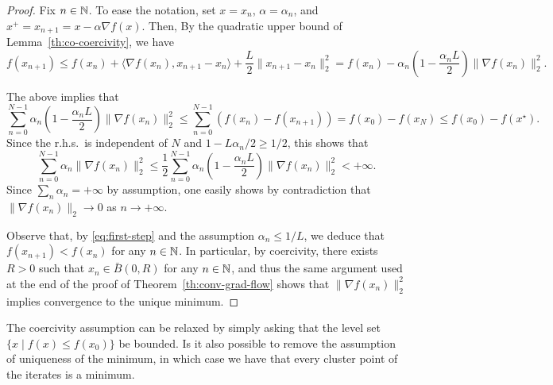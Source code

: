 \documentclass{report}
\begin{document}
\begin{proof}
	Fix $n\in\mathbb{N}$.
	To ease the notation, set $x=x_n$, $\alpha = \alpha_n$, and $x^+=x_{n+1}=x-\alpha \nabla f(x)$. Then, 
	By the quadratic upper bound of Lemma~\ref{th:co-coercivity}, we have
	\begin{equation}
		\label{eq:first-step}
			f(x_{n+1}) 
			\le f(x_n) + \langle \nabla f(x_n), x_{n+1}-x_n \rangle+\frac{L}2\|x_{n+1}-x_n\|_2^2
			= f(x_n)-\alpha_n \left(1-\frac{\alpha_n L}2\right) \|\nabla f(x_n)\|_2^2.
	\end{equation}

	The above implies that 
	\begin{equation}
		\sum_{n=0}^{N-1} \alpha_n \left(1-\frac{\alpha_n L}2\right) \|\nabla f(x_n)\|_2^2 \le \sum_{n=0}^{N-1} \left(f(x_{n})-f(x_{n+1})\right) =f(x_0) - f(x_N) \le f(x_0)-f(x^\star).
	\end{equation}
	Since the r.h.s.~is independent of $N$ and $1-L\alpha_n/2 \ge 1/2$, this shows that 
	\begin{equation}
		\sum_{n=0}^{N-1} \alpha_n  \|\nabla f(x_n)\|_2^2 \le
		\frac12\sum_{n=0}^{N-1} \alpha_n \left(1-\frac{\alpha_n L}2\right) \|\nabla f(x_n)\|_2^2 < +\infty.
	\end{equation}
	Since $\sum_n \alpha_n = +\infty$ by assumption, one easily shows by contradiction that $\|\nabla f(x_n)\|_2\rightarrow 0$ as $n\to +\infty$. 

	Observe that, by \eqref{eq:first-step} and the assumption $\alpha_n\le 1/L$, we deduce that $f(x_{n+1})<f(x_n)$ for any $n\in \mathbb{N}$. In particular, by coercivity, there exists $R>0$ such that $x_n\in \bar B(0,R)$ for any $n\in \mathbb{N}$, and thus the same argument used at the end of the proof of Theorem~\ref{th:conv-grad-flow} shows that $\|\nabla f(x_n)\|_2^2$ implies convergence to the unique minimum.
\end{proof}

\begin{remark}
	The coercivity assumption can be relaxed by simply asking that the level set $\{x\mid f(x)\le f(x_0)\}$ be bounded. 
	Is it also possible to remove the assumption of uniqueness of the minimum, in which case we have that every cluster point of the iterates is a minimum.
\end{remark}

\printbibliography
\end{document}
